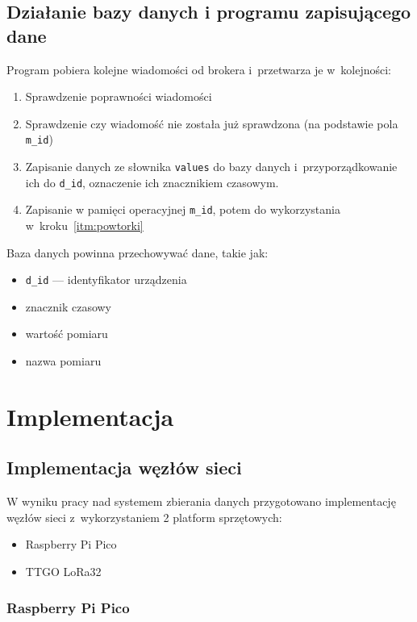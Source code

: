 \subsection{Działanie bazy danych i programu zapisującego dane}
Program pobiera kolejne wiadomości od brokera i~przetwarza je w~kolejności:
\begin{enumerate}
    \item Sprawdzenie poprawności wiadomości
          \item\label{itm:powtorki} Sprawdzenie czy wiadomość nie została już sprawdzona (na podstawie pola \texttt{m\_id})
    \item Zapisanie danych ze słownika \texttt{values} do bazy danych i~przyporządkowanie ich do \texttt{d\_id}, oznaczenie ich znacznikiem czasowym.
    \item Zapisanie w pamięci operacyjnej \texttt{m\_id}, potem do wykorzystania w~kroku~\ref{itm:powtorki}
\end{enumerate}
Baza danych powinna przechowywać dane, takie jak:
\begin{itemize}
    \item \texttt{d\_id} — identyfikator urządzenia
    \item znacznik czasowy
    \item wartość pomiaru
    \item nazwa pomiaru
\end{itemize}

\section{Implementacja}

\subsection{Implementacja węzłów sieci}
W wyniku pracy nad systemem zbierania danych przygotowano implementację węzłów sieci z~wykorzystaniem 2 platform sprzętowych:
\begin{itemize}
    \item Raspberry Pi Pico
    \item TTGO LoRa32
\end{itemize}

\subsubsection{Raspberry Pi Pico}

